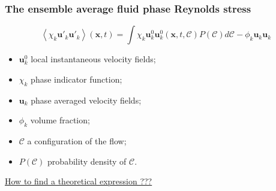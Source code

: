 \documentclass{sintefbeamer}
\newcommand{\avg}[1]{\left<#1\right>}
\newcommand{\nstavg}[1]{\overline{#1}^{nst}}
\newcommand{\CC}{\mathscr{C}}
\begin{document}
\begin{frame}
  \frametitle{The ensemble average fluid phase Reynolds stress}
  \begin{equation*}
    \avg{\chi_k \textbf{u}'_k\textbf{u}'_k}(\textbf{x},t)
    = \int  \chi_k \textbf{u}^0_k\textbf{u}^0_k(\textbf{x},t,\CC) P(\CC)d\CC 
    - \phi_k \textbf{u}_k\textbf{u}_k
\end{equation*}

\begin{itemize}
  \item $\textbf{u}_k^0$ local instantaneous velocity fields;
  \item $\chi_k$ phase indicator function;
  \item $\textbf{u}_k$ phase averaged velocity fields;
  \item $\phi_k$ volume fraction;
  \item $\CC$ a configuration of the flow;
  \item $P(\CC)$ probability density of $\CC$.
\end{itemize}


\underline{How to find a theoretical expression ??? }
\end{frame}
\end{document}
